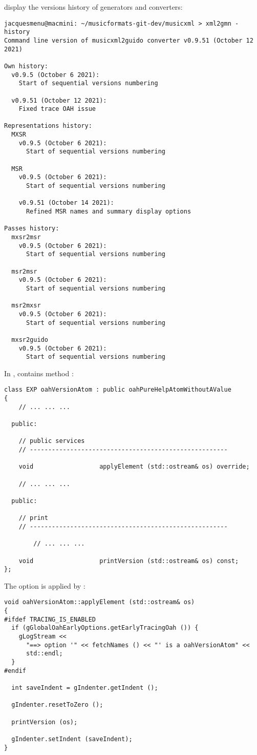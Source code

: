  display the versions history of generators and converters:
\begin{lstlisting}[language=Terminal]
jacquesmenu@macmini: ~/musicformats-git-dev/musicxml > xml2gmn -history
Command line version of musicxml2guido converter v0.9.51 (October 12 2021)

Own history:
  v0.9.5 (October 6 2021):
    Start of sequential versions numbering

  v0.9.51 (October 12 2021):
    Fixed trace OAH issue

Representations history:
  MXSR
    v0.9.5 (October 6 2021):
      Start of sequential versions numbering

  MSR
    v0.9.5 (October 6 2021):
      Start of sequential versions numbering

    v0.9.51 (October 14 2021):
      Refined MSR names and summary display options

Passes history:
  mxsr2msr
    v0.9.5 (October 6 2021):
      Start of sequential versions numbering

  msr2msr
    v0.9.5 (October 6 2021):
      Start of sequential versions numbering

  msr2mxsr
    v0.9.5 (October 6 2021):
      Start of sequential versions numbering

  mxsr2guido
    v0.9.5 (October 6 2021):
      Start of sequential versions numbering
\end{lstlisting}


In ,  contains method :
\begin{lstlisting}[language=CPlusPlus]
class EXP oahVersionAtom : public oahPureHelpAtomWithoutAValue
{
	// ... ... ...

  public:

    // public services
    // ------------------------------------------------------

    void                  applyElement (std::ostream& os) override;

	// ... ... ...

  public:

    // print
    // ------------------------------------------------------

		// ... ... ...

    void                  printVersion (std::ostream& os) const;
};
\end{lstlisting}

The option is applied by :
\begin{lstlisting}[language=CPlusPlus]
void oahVersionAtom::applyElement (std::ostream& os)
{
#ifdef TRACING_IS_ENABLED
  if (gGlobalOahEarlyOptions.getEarlyTracingOah ()) {
    gLogStream <<
      "==> option '" << fetchNames () << "' is a oahVersionAtom" <<
      std::endl;
  }
#endif

  int saveIndent = gIndenter.getIndent ();

  gIndenter.resetToZero ();

  printVersion (os);

  gIndenter.setIndent (saveIndent);
}
\end{lstlisting}


